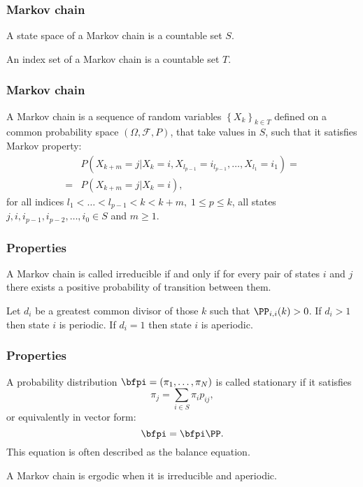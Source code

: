 \begin{frame}
	\frametitle{Markov chain}
	\begin{definition}
		 A state space of a Markov chain is a countable set $S$.
	\end{definition}
	\begin{definition}
		An index set of a Markov chain is a countable set $T$.
	\end{definition}
\end{frame}

\begin{frame}
	\frametitle{Markov chain}
	\begin{definition}
		A Markov chain is a sequence of random variables $\left\{X_k\right\}_{k \in T}$ defined on a common probability space $\left( \Omega, \mathcal{F}, P \right)$, that take values in $S$, such that it satisfies Markov property:
		\begin{align*}
			&P(X_{k+m} = j | X_k = i, X_{l_{p-1}} = i_{l_{p-1}}, \ldots, X_{l_1} = i_1) = \\= &P(X_{k+m} = j | X_k = i),
		\end{align*}
		for all indices $l_1< \ldots < l_{p-1} < k < k+m, \; 1 \leq p \leq k$, all states $j, i, i_{p-1}, i_{p-2}, \ldots, i_0 \in S$ and $m \geq 1$.
	\end{definition}
\end{frame}

\begin{frame}
	\frametitle{Properties}
	\begin{definition}[Irreducibility]
		A Markov chain is called irreducible if and only if for every pair of states $i$ and $j$ there exists a positive probability of transition between them.
	\end{definition}
	\begin{definition}[Periodicity]
		Let $d_i$ be a greatest common divisor of those $k$ such that $\PP_{i,i}(k)>0$. If $d_i > 1$ then state $i$ is periodic. If $d_i = 1$ then state $i$ is aperiodic.
	\end{definition}
\end{frame}

\begin{frame}
	\frametitle{Properties}
	\begin{definition}[Stationarity]
		A probability distribution $\bfpi = (\pi_1, \ldots, \pi_N)$ is called stationary if it satisfies
		\begin{equation*}
		\pi_j = \sum_{i \in S} \pi_i p_{ij},
		\end{equation*}
		or equivalently in vector form:
		\begin{equation*}
		\bfpi = \bfpi \PP.
		\end{equation*}
		This equation is often described as the balance equation.
	\end{definition}
	\begin{definition}[Ergodicity]
		A Markov chain is ergodic when it is irreducible and aperiodic.
	\end{definition}
\end{frame}

